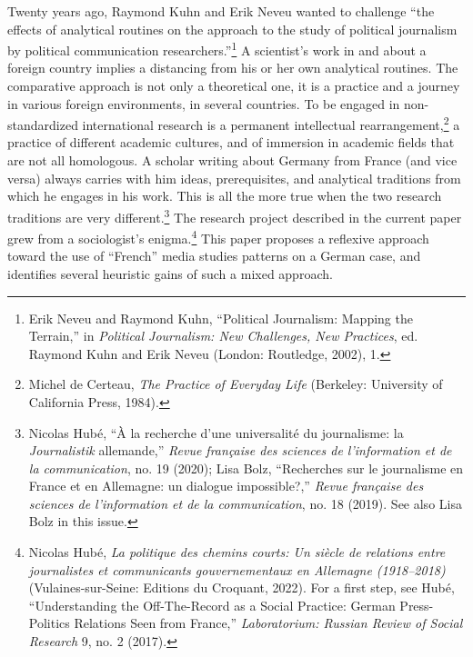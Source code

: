 \documentclass{tufte-handout}
\begin{document}
Twenty years ago, Raymond Kuhn and Erik Neveu wanted to challenge ``the
effects of analytical routines on the approach to the study of political
journalism by political communication researchers.''\footnote{Erik Neveu
  and Raymond Kuhn, ``Political Journalism: Mapping the Terrain,'' in
  \emph{Political Journalism: New Challenges, New Practices}, ed.
  Raymond Kuhn and Erik Neveu (London: Routledge, 2002), 1.} A
scientist's work in and about a foreign country implies a distancing
from his or her own analytical routines. The comparative approach is not
only a theoretical one, it is a practice and a journey in various
foreign environments, in several countries. To be engaged in
non-standardized international research is a permanent intellectual
rearrangement,\footnote{Michel de Certeau, \emph{The Practice of
  Everyday Life} (Berkeley: University of California Press, 1984).} a
practice of different academic cultures, and of immersion in academic
fields that are not all homologous. A scholar writing about Germany from
France (and vice versa) always carries with him ideas, prerequisites,
and analytical traditions from which he engages in his work. This is all
the more true when the two research traditions are very
different.\footnote{Nicolas Hubé, ``À la recherche d'une universalité du
  journalisme: la \emph{Journalistik} allemande,'' \emph{Revue française
  des sciences de l'information et de la communication}, no. 19 (2020);
  Lisa Bolz, ``Recherches sur le journalisme en France et en Allemagne:
  un dialogue impossible?,'' \emph{Revue française des sciences de
  l'information et de la communication}, no. 18 (2019). See also Lisa
  Bolz in this issue.} The research project described in the current
paper grew from a sociologist's enigma.\footnote{Nicolas Hubé, \emph{La
  politique des chemins courts: Un siècle de relations entre
  journalistes et communicants gouvernementaux en Allemagne
  (1918--2018)} (Vulaines-sur-Seine: Editions du Croquant, 2022). For a
  first step, see Hubé, ``Understanding the Off-The-Record as a Social
  Practice: German Press-Politics Relations Seen from France,''
  \emph{Laboratorium: Russian Review of Social Research} 9, no. 2
  (2017).} This paper proposes a reflexive approach toward the use of
``French'' media studies patterns on a German case, and identifies
several heuristic gains of such a mixed approach.
\end{document}
